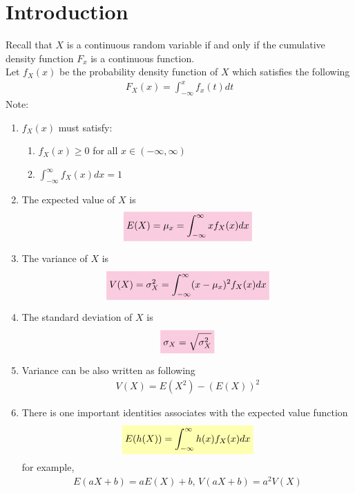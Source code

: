 \documentclass[11pt,oneside]{book}
\theoremstyle{newStyle}
\newcommand{\note}{\color{red}Note: \color{black}}
\begin{document}
\section[Introduction]{Introduction}
Recall that $X$ is a continuous random variable if and only if the cumulative density function $F_x$ is a continuous function.\\ 
Let $f_X(x)$ be the probability density function of $X$ which satisfies the following \begin{align*}
F_X(x)=\int_{-\infty}^{x}f_x(t)dt
\end{align*}
\note \begin{enumerate}
\item $f_X(x)$ must satisfy:\begin{enumerate}[itemsep=0pt, topsep=1pt, partopsep=0pt,label=(\alph*)]
\item $f_X(x)\geq 0$ for all $x\in (-\infty,\infty)$
\item $\int_{-\infty}^{\infty}f_X(x)dx=1$
\end{enumerate}
\item The expected value of $X$ is \begin{align*}
&\text{\colorbox{pink}{$E(X)=\mu_x=\int_{-\infty}^{\infty}xf_X(x)dx$}}\\
\end{align*}
\item The variance of $X$ is\begin{align*}
&\text{\colorbox{pink}{$V(X)=\sigma_X^2=\int_{-\infty}^{\infty}(x-\mu_x)^2f_X(x)dx$}}\\
\end{align*}
\item The standard deviation of $X$ is \begin{align*}
&\text{\colorbox{pink}{$\sigma_X=\sqrt{\sigma_X^2}$}}\\
\end{align*}
\item Variance can be also written as following\begin{align*}
V(X)=E(X^2)-(E(X))^2
\end{align*}
\item There is one important identities associates with the expected value function \begin{align*}
\text{\colorbox{yellow}{$E(h(X))=\int_{-\infty}^{\infty}h(x)f_X(x)dx$}}\\
\end{align*}
for example, \begin{align*}
E(aX+b)=aE(X)+b\text{, }V(aX+b)=a^2V(X)
\end{align*}
\end{enumerate} 
\end{document}
